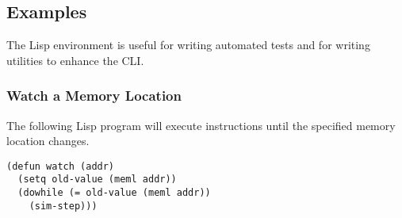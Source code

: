 \documentclass[10pt, openany]{book}
\begin{document}
\subsection{Examples}
The Lisp environment is useful for writing automated tests and for writing utilities to enhance the CLI.
\subsubsection{Watch a Memory Location}
The following Lisp program will execute instructions until the specified memory location changes.
\lstset{language=[Tiny]Lisp}
\begin{lstlisting}
(defun watch (addr)
  (setq old-value (meml addr))
  (dowhile (= old-value (meml addr))
    (sim-step)))
\end{lstlisting}

\clearpage
{}
\nocite{m68000a}
\nocite{m68000b}
\nocite{i8080}


\end{document}
